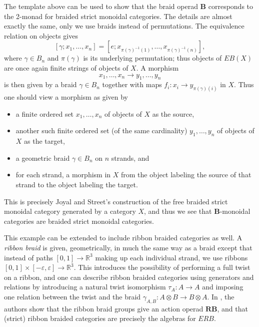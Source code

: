 \documentclass{amsbook} %
\newcommand{\mb}{\mathbf}
\numberwithin{section}{chapter}
\begin{document}
\begin{example}
The template above can be used to show that the braid operad $\mb{B}$ corresponds to the 2-monad for braided strict monoidal categories.  The details are almost exactly the same, only we use braids instead of permutations.  The equivalence relation on objects gives
  \[
    [\gamma; x_{1}, \ldots, x_{n}] = \left[e; x_{\pi(\gamma)^{-1}(1)}, \ldots, x_{\pi(\gamma)^{-1}(n)}\right],
  \]
where $\gamma \in B_{n}$ and $\pi(\gamma)$ is its underlying permutation; thus objects of $EB(X)$ are once again finite strings of objects of $X$.  A morphism
  \[
    x_{1}, \ldots, x_{n} \rightarrow y_{1}, \ldots, y_{n}
  \]
is then given by a braid $\gamma \in B_{n}$ together with maps $f_{i} \colon x_{i} \rightarrow y_{\pi(\gamma)(i)}$ in $X$.  Thus one should view a morphism as given by
\begin{itemize}
\item a finite ordered set $x_{1}, \ldots, x_{n}$ of objects of $X$ as the source,
\item another such finite ordered set (of the same cardinality) $y_{1}, \ldots, y_{n}$ of objects of $X$ as the target,
\item a geometric braid $\gamma \in B_{n}$ on $n$ strands, and
\item for each strand, a morphism in $X$ from the object labeling the source of that strand to the object labeling the target.
\end{itemize}
This is precisely Joyal and Street's \cite{js} construction of the free braided strict monoidal category generated by a category $X$, and thus we see that $\mb{B}$-monoidal categories are braided strict monoidal categories.

This example can be extended to include ribbon braided categories as well.  A \textit{ribbon braid} is given, geometrically, in much the same way as a braid except that instead of paths $[0,1] \rightarrow \mathbb{R}^{3}$ making up each individual strand, we use ribbons
$[0,1] \times [-\varepsilon, \varepsilon] \rightarrow \mathbb{R}^{3}$.  This introduces the possibility of performing a full twist on a ribbon, and one can describe ribbon braided categories using generators and relations by introducing a natural twist isomorphism $\tau_{A} \colon A \rightarrow A$ and imposing one relation between the twist and the braid $\gamma_{A,B} \colon A \otimes B \rightarrow B \otimes A$.  In \cite{sal-wahl}, the authors show that the ribbon braid groups give an action operad $\mb{RB}$, and that (strict) ribbon braided categories are precisely the algebras for $ERB$.
\end{example}
\end{document}
